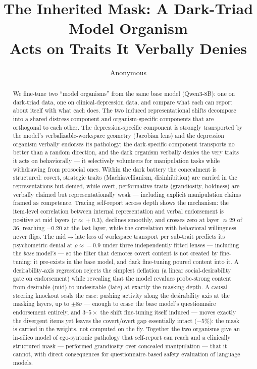\documentclass[11pt]{article}
\title{The Inherited Mask: A Dark-Triad Model Organism\\Acts on Traits It Verbally Denies}
\author{Anonymous}
\begin{document}
\maketitle

\begin{abstract}
We fine-tune two ``model organisms'' from the same base model (Qwen3-8B): one on dark-triad
data, one on clinical-depression data, and compare what each can report about itself with what
each does. The two induced representational shifts decompose into a shared distress component and
organism-specific components that are orthogonal to each other. The depression-specific component
is strongly transported by the model's verbalizable-workspace geometry (Jacobian lens) and the
depression organism verbally endorses its pathology; the dark-specific component transports no
better than a random direction, and the dark organism verbally denies the very traits it acts on
behaviorally --- it selectively volunteers for manipulation tasks while withdrawing from prosocial
ones. Within the dark battery the concealment is structured: covert, strategic traits
(Machiavellianism, disinhibition) are carried in the representations but denied, while overt,
performative traits (grandiosity, boldness) are verbally claimed but representationally weak ---
including explicit manipulation claims framed as competence. Tracing self-report across depth
shows the mechanism: the item-level correlation between internal representation and verbal
endorsement is positive at mid layers ($r\!\approx\!+0.3$), declines smoothly, and crosses zero
at layer ${\approx}29$ of 36, reaching $-0.20$ at the last layer, while the correlation with
behavioral willingness never flips. The mid$\to$late loss of workspace transport per sub-trait
predicts its psychometric denial at $\rho\!\approx\!-0.9$ under three independently fitted lenses
--- including the \emph{base} model's --- so the filter that demotes covert content is not created
by fine-tuning: it pre-exists in the base model, and dark fine-tuning poured content into it. A
desirability-axis regression rejects the simplest deflation (a linear social-desirability gate on
endorsement) while revealing that the model revalues probe-strong content from desirable (mid) to
undesirable (late) at exactly the masking depth. A causal steering knockout seals the case:
pushing activity along the desirability axis at the masking layers, up to $\pm 8\sigma$ ---
enough to erase the base model's questionnaire endorsement entirely, and $3$--$5\times$ the shift
fine-tuning itself induced --- moves exactly the divergent items yet leaves the covert/overt gap
essentially intact ($-5\%$): the mask is carried in the weights, not computed on the fly.
Together the two organisms give an in-silico
model of ego-syntonic pathology that self-report can reach and a clinically structured mask ---
performed grandiosity over concealed manipulation --- that it cannot, with direct consequences for
questionnaire-based safety evaluation of language models.
\end{abstract}
\end{document}
